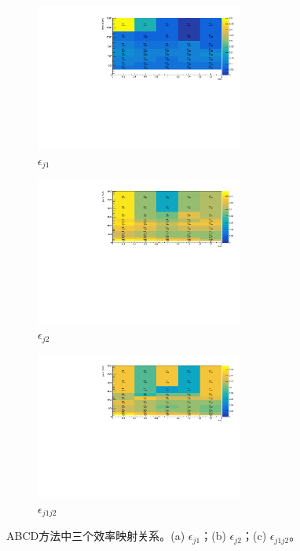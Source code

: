 \begin{figure}[!thbp]
  \begin{subfigure}{1\textwidth}
  \centering
  \includegraphics[width=0.75\textwidth]{figuresDijet/04-BackgroundEstimation/lead_map.pdf}
  \caption{$\epsilon_{j1}$}
  \end{subfigure}
  \begin{subfigure}{1\textwidth}
  \centering
  \includegraphics[width=0.75\textwidth]{figuresDijet/04-BackgroundEstimation/sublead_map.pdf}
  \caption{$\epsilon_{j2}$}
  \end{subfigure}
\newline 
  \begin{subfigure}{1\textwidth}
  \centering
  \includegraphics[width=0.75\textwidth]{figuresDijet/04-BackgroundEstimation/conditional_eff.pdf}
  \caption{$\epsilon_{j1j2}$}
  \end{subfigure}
  \caption{ABCD方法中三个效率映射关系。(a) $\epsilon_{j1}$；(b) $\epsilon_{j2}$；(c) $\epsilon_{j1j2}$。}
\label{fig:maps}
\end{figure}



